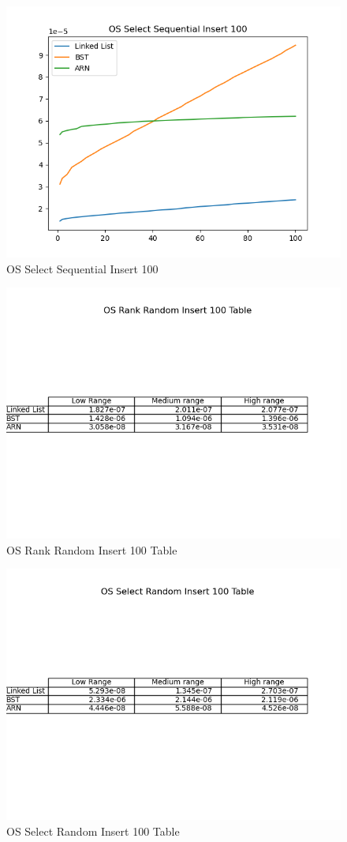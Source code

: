 \documentclass[11pt]{article}
\begin{document}
 \begin{figure}[H]
  \centering
  \includegraphics[width=0.8\linewidth]{Images/100/OS Select Sequential Insert 100.png}
  \caption{OS Select Sequential Insert 100 }
  \label{fig:OS Select Sequential Insert 500}
\end{figure}
 \begin{figure}[H]
  \centering
  \includegraphics[width=0.8\linewidth]{Images/100/OS Rank Random Insert 100 Table.png}
  \caption{OS Rank Random Insert 100 Table }
  \label{fig:OS Rank Random Insert 100 Table}
\end{figure}
 \begin{figure}[H]
  \centering
  \includegraphics[width=0.8\linewidth]{Images/100/OS Select Random Insert 100 Table.png}
  \caption{OS Select Random Insert 100 Table }
  \label{fig:OS Select Random Insert 100 Table}
\end{figure}
\end{document}
